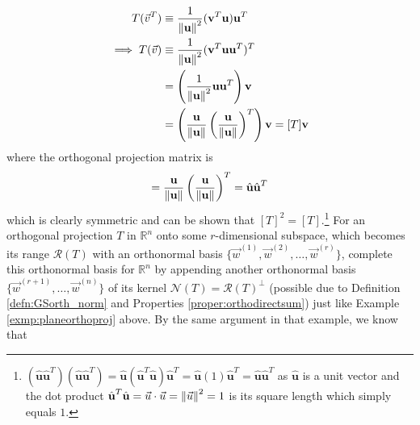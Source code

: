 \begin{align*}
T(\vec{v}^T) &\equiv \frac{1}{\norm{\textbf{u}}^2}(\textbf{v}^T\textbf{u})\textbf{u}^T \\
\implies T(\vec{v}) &\equiv \frac{1}{\norm{\textbf{u}}^2}(\textbf{v}^T\textbf{u}\textbf{u}^T)^T \\
&= \left(\frac{1}{\norm{\textbf{u}}^2}\textbf{u}\textbf{u}^T\right)\textbf{v} \\
&= \left(\frac{\textbf{u}}{\norm{\textbf{u}}}\left(\frac{\textbf{u}}{\norm{\textbf{u}}}\right)^T\right)\textbf{v} = [T]\textbf{v}
\end{align*}
where the orthogonal projection matrix is 
\begin{align}
[T] = \frac{\textbf{u}}{\norm{\textbf{u}}}\left(\frac{\textbf{u}}{\norm{\textbf{u}}}\right)^T = \hat{\textbf{u}}\hat{\textbf{u}}^T    
\end{align} which is clearly symmetric and can be shown that $[T]^2 = [T]$.\footnote{$(\hat{\textbf{u}}\hat{\textbf{u}}^T)(\hat{\textbf{u}}\hat{\textbf{u}}^T) = \hat{\textbf{u}}(\hat{\textbf{u}}^T\hat{\textbf{u}})\hat{\textbf{u}}^T = \hat{\textbf{u}}(1)\hat{\textbf{u}}^T = \hat{\textbf{u}}\hat{\textbf{u}}^T$ as $\hat{\textbf{u}}$ is a unit vector and the dot product $\hat{\textbf{u}}^T\hat{\textbf{u}} = \vec{u}\cdot\vec{u} = \norm{\vec{u}}^2 = 1$ is its square length which simply equals $1$.} For an orthogonal projection $T$ in $\mathbb{R}^n$ onto some $r$-dimensional subspace, which becomes its range $\mathcal{R}(T)$ with an orthonormal basis $\{\vec{w}^{(1)}, \vec{w}^{(2)}, \ldots, \vec{w}^{(r)}\}$, complete this orthonormal basis for $\mathbb{R}^n$ by appending another orthonormal basis $\{\vec{w}^{(r+1)}, \ldots, \vec{w}^{(n)}\}$ of its kernel $\mathcal{N}(T) = \mathcal{R}(T)^\perp$ (possible due to Definition \ref{defn:GSorth_norm} and Properties \ref{proper:orthodirectsum}) just like Example \ref{exmp:planeorthoproj} above. By the same argument in that example, we know that
